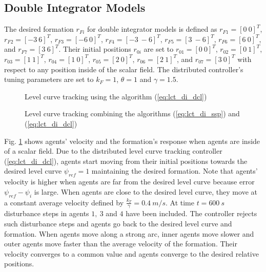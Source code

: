 \subsection{Double Integrator Models}


The desired formation $r_{Fi}$ for double integrator models is defined as $r_{F1}=[0 \ 0]^T$,  $r_{F2}=[-3 \ 6]^T$, $r_{F3}=[-6 \ 0]^T$,  $r_{F4}=[-3 \ -6]^T$, $r_{F5}=[3 \ -6]^T$,  $r_{F6}=[6 \ 0]^T$, and $r_{F7}=[3 \ 6]^T$.
Their initial positions  $r_{0i}$ are set to $r_{01}=[0 \ 0]^T$,  $r_{02}=[0 \ 1]^T$, $r_{03}=[1 \ 1]^T$,  $r_{04}=[1 \ 0]^T$, $r_{05}=[2 \ 0]^T$,  $r_{06}=[2 \ 1]^T$, and $r_{07}=[3 \ 0]^T$ with respect to any position inside of the scalar field.
The distributed controller's tuning parameters are set to $k_F=1$, $\theta= 1$ and $\gamma= 1.5$. %

\begin{figure}[ht]
  \centering
     \caption{Level curve tracking using the algorithm (\ref{eq:lct_di_dcl}) %
  }
  \label{fig:di_lct_perturb}
\end{figure}

\begin{figure}[!ht]
  \centering
  \caption{Level curve tracking combining the algorithms (\ref{eq:lct_di_ssp}) and  (\ref{eq:lct_di_dcl}) }
  \label{fig:di_lct_change_ref_switch}
\end{figure}


Fig. \ref{fig:di_lct_perturb} shows agents' velocity and the formation's response  when agents are inside of a scalar field. Due to the distributed level curve tracking controller (\ref{eq:lct_di_dcl}), agents start moving from their initial positions towards the desired level curve  $\psi_{ref}=1$ maintaining the desired formation. Note that  agents' velocity is higher when agents are far from the desired level curve because error $\psi_{ref}-\psi_i$ is large. When agents are close to the desired level curve, they move at a constant average velocity defined by $\frac{k_T}{\gamma}=0.4 \ m/s$. At time $t=600 \ s$  disturbance steps in agents $1,\ 3$ and $4$ have been  included. The controller rejects such disturbance steps and agents go back to the desired level curve and formation. When agents move along a strong arc, inner agents move slower and outer agents move faster than the average velocity of the formation. Their velocity converges to a common value and agents converge to the desired relative positions.

